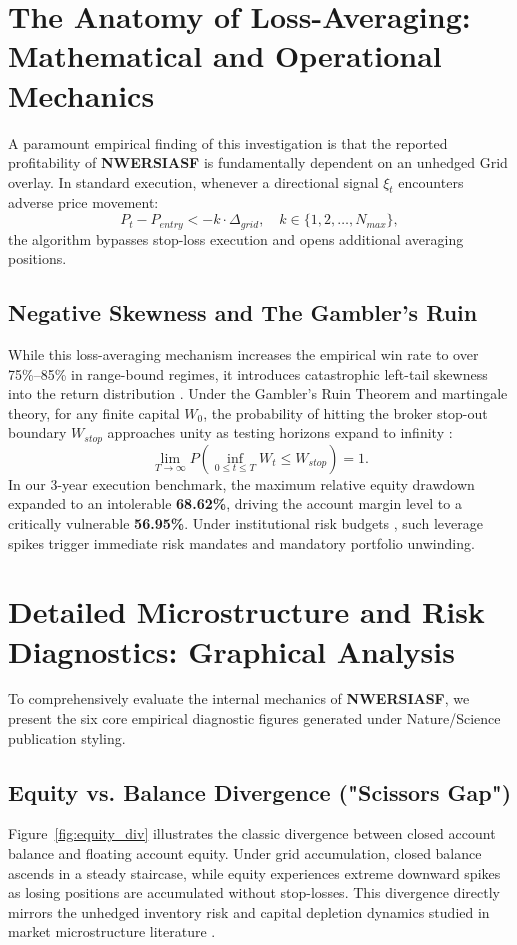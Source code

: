 \documentclass[11pt,a4paper]{article}
\begin{document}
\section{The Anatomy of Loss-Averaging: Mathematical and Operational Mechanics}
A paramount empirical finding of this investigation is that the reported profitability of \textbf{NWERSIASF} is fundamentally dependent on an unhedged Grid overlay. In standard execution, whenever a directional signal $\xi_t$ encounters adverse price movement:
\begin{equation}
P_t - P_{entry} < -k \cdot \Delta_{grid}, \quad k \in \{1, 2, \dots, N_{max}\},
\end{equation}
the algorithm bypasses stop-loss execution and opens additional averaging positions. 

\subsection{Negative Skewness and The Gambler's Ruin}
While this loss-averaging mechanism increases the empirical win rate to over 75\%--85\% in range-bound regimes, it introduces catastrophic left-tail skewness into the return distribution \cite{bouchaud2003theory, cont2001empirical}. Under the Gambler's Ruin Theorem and martingale theory, for any finite capital $W_0$, the probability of hitting the broker stop-out boundary $W_{stop}$ approaches unity as testing horizons expand to infinity \cite{bouchaud2009markets}:
\begin{equation}
\lim_{T \to \infty} P\left(\inf_{0 \le t \le T} W_t \le W_{stop}\right) = 1.
\end{equation}
In our 3-year execution benchmark, the maximum relative equity drawdown expanded to an intolerable \textbf{68.62\%}, driving the account margin level to a critically vulnerable \textbf{56.95\%}. Under institutional risk budgets \cite{rockafellar2000optimization, shleifer1997limits}, such leverage spikes trigger immediate risk mandates and mandatory portfolio unwinding.


\section{Detailed Microstructure and Risk Diagnostics: Graphical Analysis}
To comprehensively evaluate the internal mechanics of \textbf{NWERSIASF}, we present the six core empirical diagnostic figures generated under Nature/Science publication styling.

\subsection{Equity vs. Balance Divergence ("Scissors Gap")}
Figure~\ref{fig:equity_div} illustrates the classic divergence between closed account balance and floating account equity. Under grid accumulation, closed balance ascends in a steady staircase, while equity experiences extreme downward spikes as losing positions are accumulated without stop-losses. This divergence directly mirrors the unhedged inventory risk and capital depletion dynamics studied in market microstructure literature \cite{shleifer1997limits, bouchaud2009markets}.
\end{document}
